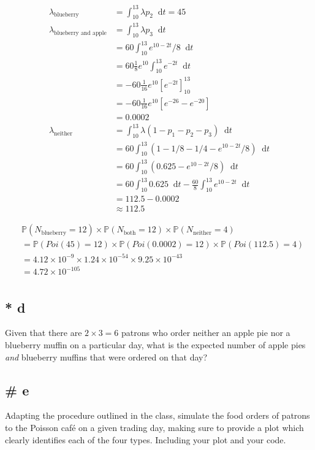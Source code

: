 \documentclass{article}
\newcommand{\diff}{\mathop{}\!\mathrm{d}}
\newcommand{\prob}{\mathbb{P}}
\begin{document}
\begin{align*}
    \lambda_{\text{blueberry}} &= \int_{10}^{13} \lambda p_2 \diff t = 45 \\
    \lambda_{\text{blueberry and apple}} &= \int_{10}^{13} \lambda p_3 \diff t \\
    &= 60 \int_{10}^{13} e^{10 - 2t}/8 \diff t \\
    &= 60 \frac{1}{8}e^{10} \int_{10}^{13} e^{-2t} \diff t \\
    &= -60 \frac{1}{16}e^{10} \left[e^{-2t}\right]_{10}^{13} \\
    &= -60 \frac{1}{16}e^{10} \left[e^{-26} - e^{-20}\right] \\
    &= 0.0002 \\
    \lambda_{\text{neither}}
    &= \int_{10}^{13} \lambda (1 - p_1 - p_2 - p_3) \diff t \\
    &= 60 \int_{10}^{13} (1 - 1/8 - 1/4 - e^{10 - 2t}/8) \diff t \\
    &= 60 \int_{10}^{13} (0.625 - e^{10 - 2t}/8) \diff t \\
    &= 60 \int_{10}^{13} 0.625 \diff t
    - \frac{60}{8} \int_{10}^{13} e^{10 - 2t} \diff t \\
    &= 112.5 - 0.0002 \\
    &\approx 112.5
\end{align*}

\begin{align*}
    &\prob(N_{\text{blueberry}} = 12) \times \prob(N_{\text{both}} = 12)
    \times \prob(N_{\text{neither}} = 4) \\
    &= \prob(Poi(45) = 12) \times \prob(Poi(0.0002) = 12)
    \times \prob(Poi(112.5) = 4) \\
    &= 4.12 \times 10^{-9} \times 1.24 \times 10^{-54}
    \times 9.25 \times 10^{-43} \\
    &= 4.72 \times 10^{-105} \\
\end{align*}

\subsection{* d}
Given that there are $2 \times 3 = 6$ patrons who order neither an apple pie nor
a blueberry muffin on a particular day, what is the expected number of apple 
pies \textit{and} blueberry muffins that were ordered on that day?

\subsection{\# e}
Adapting the procedure outlined in the class, simulate the food orders of
patrons to the Poisson caf\'e on a given trading day, making sure to provide a
plot which clearly identifies each of the four types. Including your plot and
your code.
\end{document}
